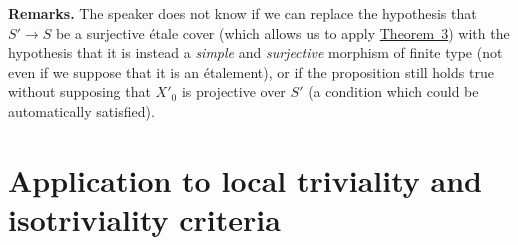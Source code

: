 \documentclass{article}
\newenvironment{rmenv}[1]
  {\phantomsection\par\medskip\noindent\textbf{#1.}\rmfamily}
  {\medskip}
\begin{document}
\begin{rmenv}{Remarks}
  The speaker does not know if we can replace the hypothesis that $S'\to S$ be a surjective \'{e}tale cover (which allows us to apply \hyperref[theorem:B.1(3)]{Theorem~3}) with the hypothesis that it is instead a \emph{simple} and \emph{surjective} morphism of finite type (not even if we suppose that it is an \'{e}talement), or if the proposition still holds true without supposing that $X'_0$ is projective over $S'$ (a condition which could be automatically satisfied).
\end{rmenv}


\section{Application to local triviality and isotriviality criteria}
\label{B.6}
\end{document}
